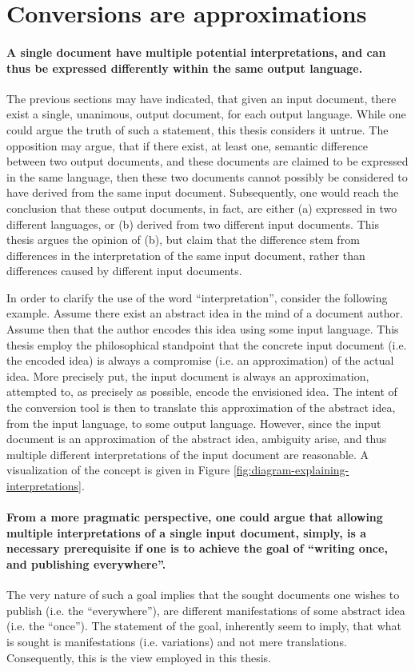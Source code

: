 \documentclass{scrreprt}
\begin{document}
\section{Conversions are approximations}
\paragraph{A single document have multiple potential interpretations, and can thus be expressed differently within the same output language.} The previous sections may have indicated, that given an input document, there exist a single, unanimous, output document, for each output language. While one could argue the truth of such a statement, this thesis considers it untrue.  The opposition may argue, that if there exist, at least one, semantic difference between two output documents, and these documents are claimed to be expressed in the same language, then these two documents cannot possibly be considered to have derived from the same input document. Subsequently, one would reach the conclusion that these output documents, in fact, are either (a) expressed in two different languages, or (b) derived from two different input documents. This thesis argues the opinion of (b), but claim that the difference stem from differences in the interpretation of the same input document, rather than differences caused by different input documents.

In order to clarify the use of the word ``interpretation'', consider the following example. Assume there exist an abstract idea in the mind of a document author. Assume then that the author encodes this idea using some input language. This thesis employ the philosophical standpoint that the concrete input document (i.e. the encoded idea) is always a compromise (i.e. an approximation) of the actual idea. More precisely put, the input document is always an approximation, attempted to, as precisely as possible, encode the envisioned idea. The intent of the conversion tool is then to translate this approximation of the abstract idea, from the input language, to some output language.  However, since the input document is an approximation of the abstract idea, ambiguity arise, and thus multiple different interpretations of the input document are reasonable. A visualization of the concept is given in Figure \ref{fig:diagram-explaining-interpretations}.

\paragraph{From a more pragmatic perspective, one could argue that allowing multiple interpretations of a single input document, simply, is a necessary prerequisite if one is to achieve the goal of ``writing once, and publishing everywhere''.} The very nature of such a goal implies that the sought documents one wishes to publish (i.e. the ``everywhere''), are different manifestations of some abstract idea (i.e. the ``once''). The statement of the goal, inherently seem to imply, that what is sought is manifestations (i.e. variations) and not mere translations. Consequently, this is the view employed in this thesis.
\end{document}
